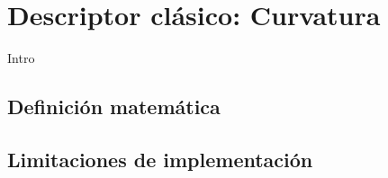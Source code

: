 \section{Descriptor clásico: Curvatura}

Intro 

\subsection{Definición matemática}

\subsection{Limitaciones de implementación}